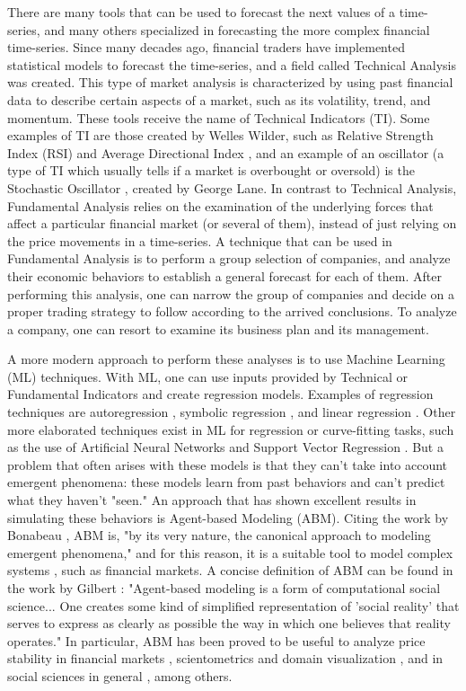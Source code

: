 \documentclass[12pt,journal,draftcls,onecolumn]{IEEEtran}
\begin{document}
There are many tools that can be used to forecast the next values of a time-series, and many others specialized in forecasting the more complex financial time-series. Since many decades ago, financial traders have implemented statistical models to forecast the time-series, and a field called Technical Analysis was created. This type of market analysis is characterized by using past financial data to describe certain aspects of a market, such as its volatility, trend, and momentum. These tools receive the name of Technical Indicators (TI). Some examples of TI are those created by Welles Wilder, such as Relative Strength Index (RSI) and Average Directional Index \cite{wilder1978new}, and an example of an oscillator (a type of TI which usually tells if a market is overbought or oversold) is the Stochastic Oscillator \cite{schirding1984stochastic}, created by George Lane. In contrast to Technical Analysis, Fundamental Analysis relies on the examination of the underlying forces that affect a particular financial market (or several of them), instead of just relying on the price movements in a time-series. A technique that can be used in Fundamental Analysis is to perform a group selection of companies, and analyze their economic behaviors to establish a general forecast for each of them. After performing this analysis, one can narrow the group of companies and decide on a proper trading strategy to follow according to the arrived conclusions. To analyze a company, one can resort to examine its business plan and its management.

A more modern approach to perform these analyses is to use Machine Learning (ML) techniques. With ML, one can use inputs provided by Technical or Fundamental Indicators and create regression models. Examples of regression techniques are autoregression \cite{burg1968new}, symbolic regression \cite{billard2002symbolic}, and linear regression \cite{kutner2004applied}. Other more elaborated techniques exist in ML for regression or curve-fitting tasks, such as the use of Artificial Neural Networks \cite{melin2007hybrid} and Support Vector Regression \cite{basak2007support}. But a problem that often arises with these models is that they can't take into account emergent phenomena: these models learn from past behaviors and can't predict what they haven't "seen." An approach that has shown excellent results in simulating these behaviors is Agent-based Modeling (ABM). Citing the work by Bonabeau \cite{bonabeau2002agent}, ABM is, "by its very nature, the canonical approach to modeling emergent phenomena," and for this reason, it is a suitable tool to model complex systems \cite{jennings2001agent}, such as financial markets. A concise definition of ABM can be found in the work by Gilbert \cite{gilbert2008agent}: "Agent-based modeling is a form of computational social science... One creates some kind of simplified representation of 'social reality' that serves to express as clearly as possible the way in which one believes that reality operates." In particular, ABM has been proved to be useful to analyze price stability in financial markets \cite{Pellizzari2007}, scientometrics and domain visualization \cite{Niazi2011}, and in social sciences in general \cite{gilbert2008agent}, among others.
\end{document}
